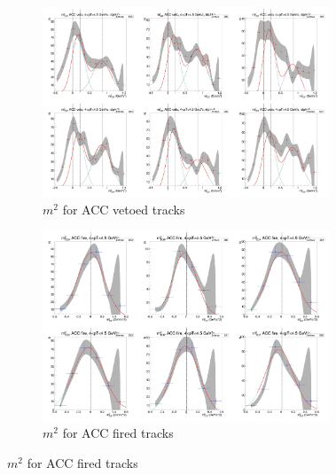 \begin{figure}[H]
  \ContinuedFloat
    \begin{subfigure}{1\textwidth}
   \centering
   \includegraphics[width=0.94\textwidth]{hiptfits/pos/PSm2_cent0_ich1_accfire0_ptbin14.jpg}
    \caption{$m^2$ for ACC vetoed tracks}
    \end{subfigure}
    \begin{subfigure}{1\textwidth}
   \centering
   \includegraphics[width=0.94\textwidth]{hiptfits/pos/PSm2_cent0_ich1_accfire1_ptbin14.jpg}
    \caption{$m^2$ for ACC fired tracks}
    \end{subfigure}  
\end{figure}
